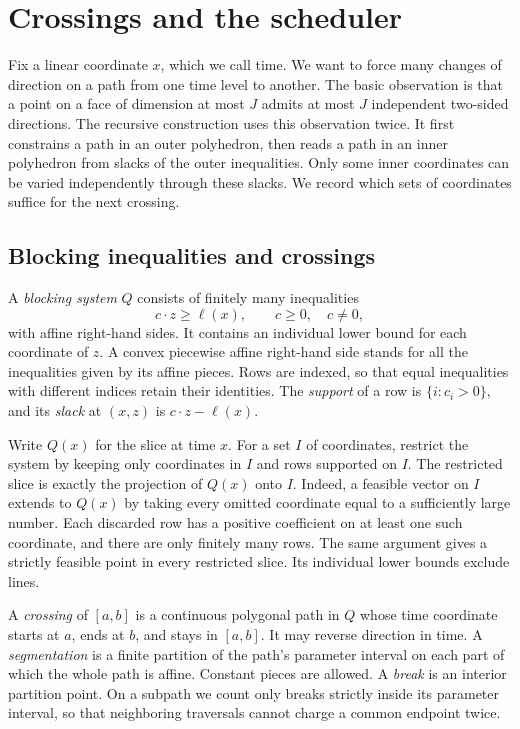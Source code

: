 \section{Crossings and the scheduler}\label{sec:framework}

Fix a linear coordinate \(x\), which we call time. We want to force many
changes of direction on a path from one time level to another. The basic
observation is that a point on a face of dimension at most \(J\) admits
at most \(J\) independent two-sided directions. The recursive construction
uses this observation twice. It first constrains a path in an outer
polyhedron, then reads a path in an inner polyhedron from slacks of the
outer inequalities. Only some inner coordinates can be varied independently
through these slacks. We record which sets of coordinates suffice for the
next crossing.

\subsection{Blocking inequalities and crossings}

A \emph{blocking system} \(Q\) consists of finitely many inequalities
\begin{equation}\label{eq:blocking-row}
             c\cdot z\geq \ell(x),\qquad c\geq0,\quad c\ne0,
\end{equation}
with affine right-hand sides. It contains an individual lower bound for
each coordinate of \(z\). A convex piecewise affine right-hand side stands
for all the inequalities given by its affine pieces. Rows are indexed,
so that equal inequalities with different indices retain their identities.
The \emph{support} of a row is \(\{i:c_i>0\}\), and its \emph{slack} at
\((x,z)\) is \(c\cdot z-\ell(x)\).

Write \(Q(x)\) for the slice at time \(x\). For a set \(I\) of coordinates,
restrict the system by keeping only coordinates in \(I\) and rows supported
on \(I\). The restricted slice is exactly the projection of \(Q(x)\) onto
\(I\). Indeed, a feasible vector on \(I\) extends to \(Q(x)\) by taking
every omitted coordinate equal to a sufficiently large number. Each
discarded row has a positive coefficient on at least one such coordinate,
and there are only finitely many rows. The same argument gives a strictly
feasible point in every restricted slice. Its individual lower bounds
exclude lines.

A \emph{crossing} of \([a,b]\) is a continuous polygonal path in \(Q\)
whose time coordinate starts at \(a\), ends at \(b\), and stays in
\([a,b]\). It may reverse direction in time. A \emph{segmentation} is a
finite partition of the path's parameter interval on each part of which
the whole path is affine. Constant pieces are allowed. A \emph{break} is
an interior partition point. On a subpath we count only breaks strictly
inside its parameter interval, so that neighboring traversals cannot
charge a common endpoint twice.

